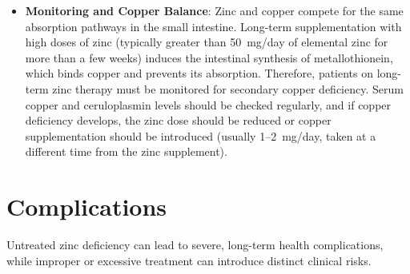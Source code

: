 \begin{itemize}
    \item \textbf{Monitoring and Copper Balance}: Zinc and copper compete for the same absorption pathways in the small intestine. Long-term supplementation with high doses of zinc (typically greater than 50~mg/day of elemental zinc for more than a few weeks) induces the intestinal synthesis of metallothionein, which binds copper and prevents its absorption. Therefore, patients on long-term zinc therapy must be monitored for secondary copper deficiency. Serum copper and ceruloplasmin levels should be checked regularly, and if copper deficiency develops, the zinc dose should be reduced or copper supplementation should be introduced (usually 1--2~mg/day, taken at a different time from the zinc supplement).
\end{itemize}

\section*{Complications}
Untreated zinc deficiency can lead to severe, long-term health complications, while improper or excessive treatment can introduce distinct clinical risks.

